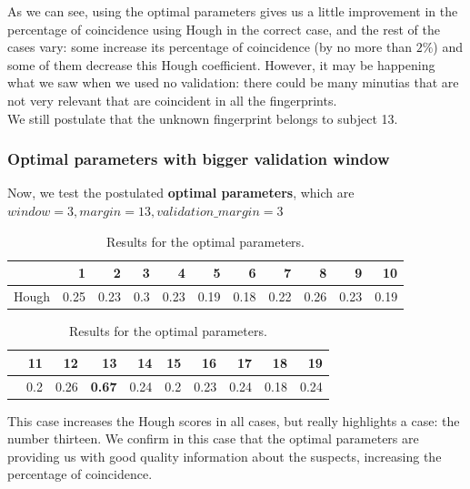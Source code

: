 \documentclass[a4paper]{article}
\begin{document}
As we can see, using the optimal parameters gives us a little improvement in the percentage of coincidence using Hough in the correct case, and the rest of the cases vary: some increase its percentage of coincidence (by no more than \(2\%\)) and some of them decrease this Hough coefficient. However, it may be happening what we saw when we used no validation: there could be many minutias that are not very relevant that are coincident in all the fingerprints.\\

We still postulate that the unknown fingerprint belongs to subject 13.


\subsubsection{Optimal parameters with bigger validation window}

Now, we test the postulated \textbf{optimal parameters}, which are \(window = 3, margin = 13,validation\_margin = 3\) 

\begin{table}[H]
  \centering
  \begin{tabular}{lrrrrrrrrrr}

    {} &    1  &    2  &   3  &    4  &    5  &    6  &    7  &    8  &    9  &    10 \\
    \midrule
    Hough &  0.25 &  0.23 &  0.3 &  0.23 &  0.19 &  0.18 &  0.22 &  0.26 &  0.23 &  0.19 \\

    \end{tabular}
    
    \begin{tabular}{lrrrrrrrrr}

    {} &   11 &    12 &    13 &    14 &   15 &    16 &    17 &    18 &    19 \\
    \midrule
     &  0.2 &  0.26 &  \textbf{0.67} &  0.24 &  0.2 &  0.23 &  0.24 &  0.18 &  0.24 \\

    \end{tabular}
  \caption{Results for the optimal parameters.}
\end{table}


This case increases the Hough scores in all cases, but really highlights a case: the number thirteen. We confirm in this case that the optimal parameters are providing us with good quality information about the suspects, increasing the percentage of coincidence.
\end{document}
